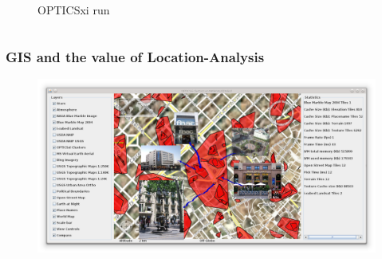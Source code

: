 \documentclass[hyperref={pdfpagelabels=true}]{beamer}
\begin{document}
\begin{frame}
\begin{columns}
\begin{column}{0.5\textwidth}
\begin{figure}
           \tiny{OPTICSxi run}%
       \end{figure}  
  \end{column}  
\end{columns}
\end{frame}

\begin{frame}
\frametitle{GIS and the value of Location-Analysis}
  \begin{figure}   
    \includegraphics[width=\textwidth]{case_study.png}   
  \end{figure}     
\end{frame}
\end{document}
